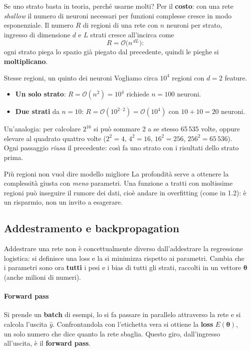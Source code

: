 \documentclass[12pt]{extarticle}
\begin{document}
\noindent Se uno strato basta in teoria, perché usarne molti? Per il \textbf{costo}: con una rete \emph{shallow} il numero di neuroni necessari per funzioni complesse cresce in modo esponenziale. Il numero $R$ di regioni di una rete con $n$ neuroni per strato, ingresso di dimensione $d$ e $L$ strati cresce all'incirca come
\[
R=\mathcal{O}\!\big(n^{\,dL}\big):
\]
ogni strato piega lo spazio già piegato dal precedente, quindi le pieghe si \textbf{moltiplicano}.

\begin{esempiobox}{Stesse regioni, un quinto dei neuroni}
Vogliamo circa $10^4$ regioni con $d=2$ feature.
\begin{itemize}
    \item \textbf{Un solo strato}: $R=\mathcal{O}(n^2)=10^4$ richiede $n=100$ neuroni.
    \item \textbf{Due strati} da $n=10$: $R=\mathcal{O}(10^{2\cdot2})=\mathcal{O}(10^4)$ con $10+10=20$ neuroni.
\end{itemize}
Un'analogia: per calcolare $2^{16}$ si può sommare 2 a se stesso 65\,535 volte, oppure elevare al quadrato quattro volte ($2^2=4$, $4^2=16$, $16^2=256$, $256^2=65\,536$). Ogni passaggio \emph{riusa} il precedente: così fa uno strato con i risultati dello strato prima.
\end{esempiobox}

\begin{attenzionebox}{Più regioni non vuol dire modello migliore}
La profondità serve a ottenere la complessità giusta con \emph{meno} parametri. Una funzione a tratti con moltissime regioni può inseguire il rumore dei dati, cioè andare in overfitting (come in 1.2): è un risparmio, non un invito a esagerare.
\end{attenzionebox}

\subsection{Addestramento e backpropagation}

\noindent Addestrare una rete non è concettualmente diverso dall'addestrare la regressione logistica: si definisce una loss e la si minimizza rispetto ai parametri. Cambia che i parametri sono ora \textbf{tutti} i pesi e i bias di tutti gli strati, raccolti in un vettore $\boldsymbol{\theta}$ (anche milioni di numeri).

\paragraph{Forward pass}
Si prende un \textbf{batch} di esempi, lo si fa passare in parallelo attraverso la rete e si calcola l'uscita $\hat{y}$. Confrontandola con l'etichetta vera si ottiene la \textbf{loss} $E(\boldsymbol{\theta})$, un solo numero che dice quanto la rete sbaglia. Questo giro, dall'ingresso all'uscita, è il \textbf{forward pass}.
\end{document}
